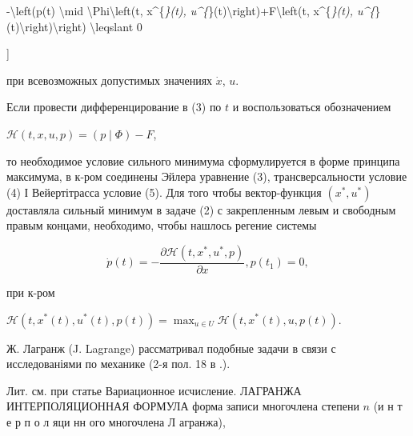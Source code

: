 \documentclass[10pt]{article}
\begin{document}
-\textbackslash left(p(t) \textbackslash mid \textbackslash Phi\textbackslash left(t, x\^{}\{\textit{\}(t), u\^{}\{}\}(t)\textbackslash right)+F\textbackslash left(t, x\^{}\{\textit{\}(t), u\^{}\{}\}(t)\textbackslash right)\textbackslash right) \textbackslash leqslant 0

]



при всевозможных допустимых значениях $\dot{x}$, $u$.



Если провести дифференцирование в (3) по $t$ и воспользоваться обозначением



$\mathscr{H}(t, x, u, p)=(p \mid \Phi)-F$,



то необходимое условие сильного минимума сформулируется в форме принципа максимума, в к-ром соединены Эйлера уравнение (3), трансверсальности условие (4) І Вейертітрасса условие (5). Для того чтобы вектор-функция $\left(x^{*}, u^{*}\right)$ доставляла сильный минимум в задаче (2) с закрепленным левым и свободным правым концами, необходимо, чтобы нашлось регение системы



\[

\dot{p}(t)=-\frac{\partial \mathscr{H}\left(t, x^{*}, u^{*}, p\right)}{\partial x}, p\left(t_{1}\right)=0,

\]



при к-ром



$\mathscr{H}\left(t, x^{*}(t), u^{*}(t), p(t)\right)=\max _{u \in U} \mathscr{H}\left(t, x^{*}(t), u, p(t)\right)$.



Ж. Лагранж (J. Lagrange) рассматривал подобные задачи в связи с исследованіями по механике (2-я пол. 18 в .).



Лит. см. при статье Вариационное исчисление. ЛАГРАНЖА ИНТЕРПОЛЯЦИОННАЯ ФОРМУЛА форма записи многочлена степени $n$ (и н т е р п о л яци нн ого многочлена Л агранжа),
\end{document}
